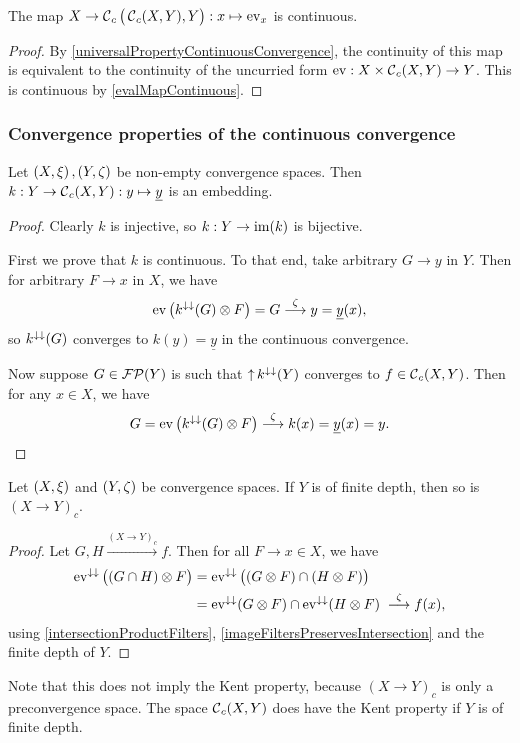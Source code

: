 \begin{proposition} \label{curriedEvalMapContinuous}
The map $X\to \operatorname{\mathcal{C}}_c\big(\operatorname{\mathcal{C}}_c(X,Y),Y\big): x\mapsto \operatorname{ev}_x$ is continuous.
\end{proposition}
\begin{proof}
By \ref{universalPropertyContinuousConvergence}, the continuity of this map is equivalent to the continuity of the uncurried form $\operatorname{ev}: X\times \operatorname{\mathcal{C}}_c(X,Y) \to Y$. This is continuous by \ref{evalMapContinuous}.
\end{proof}


\subsubsection{Convergence properties of the continuous convergence}
\begin{lemma} \label{embeddingInContinuousConvergence}
Let $\left( X,\xi \right), \left( Y,\zeta \right)$ be non-empty convergence spaces. Then $k: Y \to \operatorname{\mathcal{C}}_c(X,Y): y\mapsto \underline{y}$ is an embedding.
\end{lemma}
\begin{proof}
Clearly $k$ is injective, so $k: Y\to \operatorname{im}(k)$ is bijective.

First we prove that $k$ is continuous. To that end, take arbitrary $G\to y$ in $Y$. Then for arbitrary $F\to x$ in $X$, we have
\[ \operatorname{ev}\big(k^{\downarrow\downarrow}(G)\otimes F\big) = G \overset{\zeta}{\longrightarrow} y = \underline{y}(x), \]
so $k^{\downarrow\downarrow}(G)$ converges to $k(y) = \underline{y}$ in the continuous convergence.

Now suppose $G\in\operatorname{\mathcal{FP}}(Y)$ is such that $\operatorname{\uparrow} k^{\downarrow\downarrow}(Y)$ converges to $f\in \operatorname{\mathcal{C}}_c(X,Y)$. Then for any $x\in X$, we have
\[ G = \operatorname{ev}\big(k^{\downarrow\downarrow}(G)\otimes F\big) \overset{\zeta}{\longrightarrow} k(x) = \underline{y}(x) = y. \]
\end{proof}

\begin{lemma}
Let $\left( X,\xi \right)$ and $\left( Y,\zeta \right)$ be convergence spaces. If $Y$ is of finite depth, then so is $(X\to Y)_c$.
\end{lemma}
\begin{proof}
Let $G, H\overset{(X\to Y)_c}{\longrightarrow} f$. Then for all $F\to x\in X$, we have
\begin{align*}
\operatorname{ev}^{\downarrow\downarrow}\big((G\cap H)\otimes F\big) &= \operatorname{ev}^{\downarrow\downarrow}\big((G \otimes F) \cap (H \otimes F)\big) \\
&= \operatorname{ev}^{\downarrow\downarrow}(G \otimes F) \cap \operatorname{ev}^{\downarrow\downarrow}(H \otimes F) \; \overset{\zeta}{\longrightarrow} f(x),
\end{align*}
using \ref{intersectionProductFilters}, \ref{imageFiltersPreservesIntersection} and the finite depth of $Y$.
\end{proof}
Note that this does not imply the Kent property, because $(X\to Y)_c$ is only a preconvergence space. The space $\operatorname{\mathcal{C}}_c(X,Y)$ does have the Kent property if $Y$ is of finite depth.

